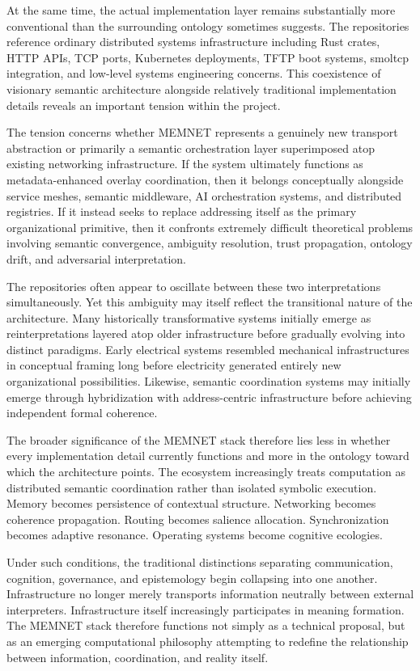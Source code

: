 \documentclass[11pt,a4paper]{article}
\begin{document}
At the same time, the actual implementation layer remains substantially more conventional than the surrounding ontology sometimes suggests. The repositories reference ordinary distributed systems infrastructure including Rust crates, HTTP APIs, TCP ports, Kubernetes deployments, TFTP boot systems, smoltcp integration, and low-level systems engineering concerns. This coexistence of visionary semantic architecture alongside relatively traditional implementation details reveals an important tension within the project.

The tension concerns whether MEMNET represents a genuinely new transport abstraction or primarily a semantic orchestration layer superimposed atop existing networking infrastructure. If the system ultimately functions as metadata-enhanced overlay coordination, then it belongs conceptually alongside service meshes, semantic middleware, AI orchestration systems, and distributed registries. If it instead seeks to replace addressing itself as the primary organizational primitive, then it confronts extremely difficult theoretical problems involving semantic convergence, ambiguity resolution, trust propagation, ontology drift, and adversarial interpretation.

The repositories often appear to oscillate between these two interpretations simultaneously. Yet this ambiguity may itself reflect the transitional nature of the architecture. Many historically transformative systems initially emerge as reinterpretations layered atop older infrastructure before gradually evolving into distinct paradigms. Early electrical systems resembled mechanical infrastructures in conceptual framing long before electricity generated entirely new organizational possibilities. Likewise, semantic coordination systems may initially emerge through hybridization with address-centric infrastructure before achieving independent formal coherence.

The broader significance of the MEMNET stack therefore lies less in whether every implementation detail currently functions and more in the ontology toward which the architecture points. The ecosystem increasingly treats computation as distributed semantic coordination rather than isolated symbolic execution. Memory becomes persistence of contextual structure. Networking becomes coherence propagation. Routing becomes salience allocation. Synchronization becomes adaptive resonance. Operating systems become cognitive ecologies.

Under such conditions, the traditional distinctions separating communication, cognition, governance, and epistemology begin collapsing into one another. Infrastructure no longer merely transports information neutrally between external interpreters. Infrastructure itself increasingly participates in meaning formation. The MEMNET stack therefore functions not simply as a technical proposal, but as an emerging computational philosophy attempting to redefine the relationship between information, coordination, and reality itself.
\end{document}
